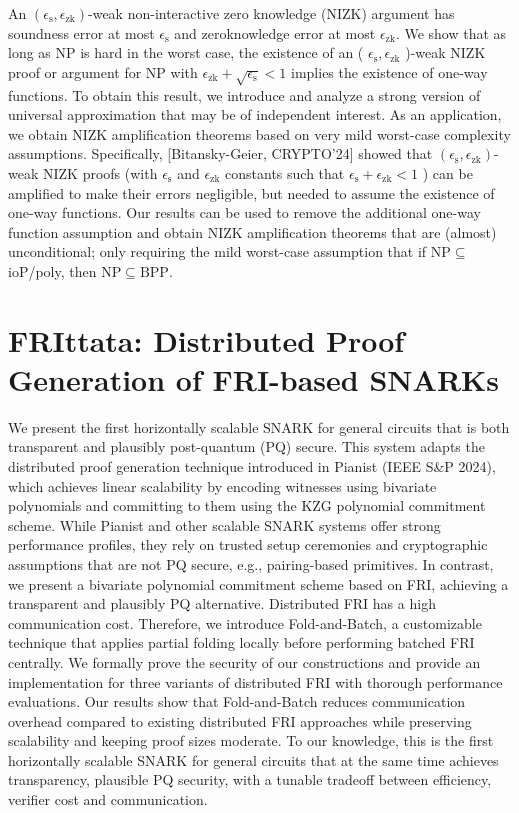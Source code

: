 \documentclass[11pt,oneside]{book}
\theoremstyle{definition}
\theoremstyle{remark}
\theoremstyle{plain}
\begin{document}
An $\left(\epsilon_{\mathrm{s}}, \epsilon_{\mathrm{zk}}\right)$-weak non-interactive zero knowledge (NIZK) argument has soundness error at most $\epsilon_{\mathrm{s}}$ and zeroknowledge error at most $\epsilon_{\mathrm{zk}}$. We show that as long as NP is hard in the worst case, the existence of an ( $\epsilon_{\mathrm{s}}, \epsilon_{\mathrm{zk}}$ )-weak NIZK proof or argument for NP with $\epsilon_{\mathrm{zk}}+\sqrt{\epsilon_{\mathrm{s}}}<1$ implies the existence of one-way functions. To obtain this result, we introduce and analyze a strong version of universal approximation that may be of independent interest.
As an application, we obtain NIZK amplification theorems based on very mild worst-case complexity assumptions. Specifically, [Bitansky-Geier, CRYPTO'24] showed that $\left(\epsilon_{\mathrm{s}}, \epsilon_{\mathrm{zk}}\right)$-weak NIZK proofs (with $\epsilon_{\mathrm{s}}$ and $\epsilon_{\mathrm{zk}}$ constants such that $\epsilon_{\mathrm{s}}+\epsilon_{\mathrm{zk}}<1$ ) can be amplified to make their errors negligible, but needed to assume the existence of one-way functions. Our results can be used to remove the additional one-way function assumption and obtain NIZK amplification theorems that are (almost) unconditional; only requiring the mild worst-case assumption that if $\mathrm{NP} \subseteq$ ioP/poly, then $\mathrm{NP} \subseteq \mathrm{BPP}$.

\section{\cite{FRIttata} FRIttata: Distributed Proof Generation of FRI-based SNARKs}
We present the first horizontally scalable SNARK for general circuits that is both transparent and plausibly post-quantum (PQ) secure. This system adapts the distributed proof generation technique introduced in Pianist (IEEE S\&P 2024), which achieves linear scalability by encoding witnesses using bivariate polynomials and committing to them using the KZG polynomial commitment scheme. While Pianist and other scalable SNARK systems offer strong performance profiles, they rely on trusted setup ceremonies and cryptographic assumptions that are not PQ secure, e.g., pairing-based primitives. In contrast, we present a bivariate polynomial commitment scheme based on FRI, achieving a transparent and plausibly PQ alternative. Distributed FRI has a high communication cost. Therefore, we introduce Fold-and-Batch, a customizable technique that applies partial folding locally before performing batched FRI centrally. We formally prove the security of our constructions and provide an implementation for three variants of distributed FRI with thorough performance evaluations. Our results show that Fold-and-Batch reduces communication overhead compared to existing distributed FRI approaches while preserving scalability and keeping proof sizes moderate. To our knowledge, this is the first horizontally scalable SNARK for general circuits that at the same time achieves transparency, plausible PQ security, with a tunable tradeoff between efficiency, verifier cost and communication.
\end{document}
